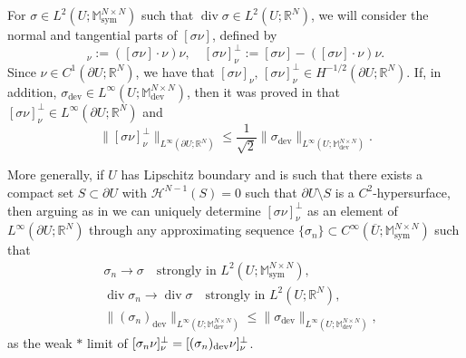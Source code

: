 \documentclass[reqno,10pt]{amsart}
\numberwithin{equation}{section}
\theoremstyle{remark}
\newcommand{\calH}{\mathcal{H}}
\newcommand{\M}{\mathbb{M}}
\newcommand{\R}{\mathbb{R}}
\newcommand{\U}{U}
\DeclareMathOperator{\dev}{dev}
\DeclareMathOperator{\sym}{sym}
\newcommand{\closure}[1]{\overline{#1}}
\newcommand{\strong}{\to}
\renewcommand{\div}{\operatorname{div}}
\newcommand{\tangential}{_\nu^\perp}
\newcommand{\normal}{_\nu}
\begin{document}
For $\sigma \in L^2(\U;\M^{N \times N}_{\sym})$ such that $\div\sigma \in L^2(\U;\R^N)$, we will consider the normal and tangential parts of $[ \sigma \nu ]$, defined by
\begin{equation*}
	[ \sigma \nu ]\normal := ([ \sigma \nu ] \cdot \nu) \nu, \quad
	[ \sigma \nu ]\tangential := [ \sigma \nu ]-([ \sigma \nu ] \cdot \nu) \nu.
\end{equation*}
Since $\nu \in C^1(\partial{\U};\R^N)$, we have that $[ \sigma \nu ]\normal,\, [ \sigma \nu ]\tangential \in H^{-1/2}(\partial{\U};\R^N)$.
If, in addition, $\sigma_{\dev} \in L^{\infty}(\U;\M^{N \times N}_{\dev})$, then it was proved in \cite[Lemma 2.4]{Kohn.Temam.1983} that $[ \sigma \nu ]\tangential \in L^{\infty}(\partial{\U};\R^N)$ and
\begin{equation*}
	\|[ \sigma \nu ]\tangential\|_{L^{\infty}(\partial{\U};\R^N)} \leq \frac{1}{\sqrt2} \|\sigma_{\dev}\|_{L^{\infty}(\U;\M^{N \times N}_{\dev})}.
\end{equation*}

More generally, if $\U$ has Lipschitz boundary and is such that there exists a compact set $S \subset \partial{U}$ with $\calH^{N-1}(S) = 0$ such that $\partial{U} \setminus S$ is a $C^2$-hypersurface, then arguing as in \cite[Section 1.2]{Francfort.Giacomini.2012} we can uniquely determine $[ \sigma \nu ]\tangential$ as an element of $L^{\infty}(\partial{U};\R^N)$ through any approximating sequence $\{\sigma_n\} \subset C^{\infty}(\closure{\U};\M^{N \times N}_{\sym})$ such that 
\begin{align*}
	& \sigma_n \strong \sigma \quad \text{strongly in } L^2(\U;\M^{N \times N}_{\sym}),\\
	& \div\sigma_n \strong \div\sigma \quad \text{strongly in } L^2(\U;\R^N),\\
	& \| (\sigma_n)_{\dev} \|_{L^{\infty}(\U;\M^{N \times N}_{\dev})} \leq \| \sigma_{\dev} \|_{L^{\infty}(\U;\M^{N \times N}_{\dev})},
\end{align*}
as the weak $*$ limit of $[\sigma_n\nu]_{\nu}^\perp=[(\sigma_n)_{\rm dev}\nu]_{\nu}^\perp$.
\end{document}
